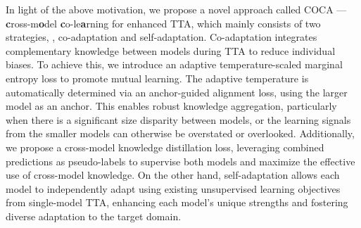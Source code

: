 In light of the above motivation, we propose a novel approach called COCA — \textbf{c}ross-m\textbf{o}del \textbf{c}o-le\textbf{a}rning for enhanced TTA, which mainly consists of two strategies, \ie, co-adaptation and self-adaptation. Co-adaptation integrates complementary knowledge between models during TTA to reduce individual biases. To achieve this, we introduce an adaptive temperature-scaled marginal entropy loss to promote mutual learning. The adaptive temperature is automatically determined via an anchor-guided alignment loss, using the larger model as an anchor. This enables robust knowledge aggregation, particularly when there is a significant size disparity between models, or the learning signals from the smaller models can otherwise be overstated or overlooked. Additionally, we propose a cross-model knowledge distillation loss, leveraging combined predictions as pseudo-labels to supervise both models and maximize the effective use of cross-model knowledge. On the other hand, self-adaptation allows each model to independently adapt using existing unsupervised learning objectives from single-model TTA, enhancing each model’s unique strengths and fostering diverse adaptation to the target domain. 








